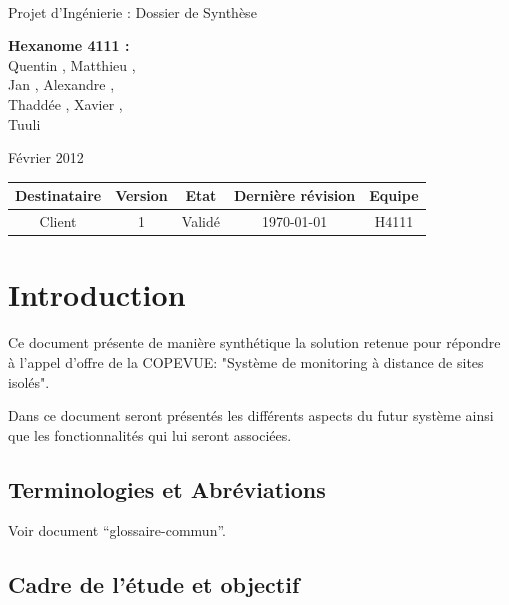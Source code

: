 \documentclass[a4paper]{article}
\begin{document}
\begin{titlepage}
~ 
\vfill
	\begin{center}
		\begin{Huge}
		Projet d'Ingénierie : Dossier de Synthèse\\
		\end{Huge} 
\vfill
		\textbf{Hexanome 4111 :} 
		\\Quentin {}, Matthieu , 
		\\Jan {}, Alexandre , 
		\\Thaddée , Xavier ,
		\\Tuuli {}
\vfill		
		\begin{Large}
		Février 2012
		\end{Large}
\vfill
	\begin{tabular}{|c|c|c|c|c|}
 	 \hline
   Destinataire & Version & Etat & Dernière révision & Equipe \\
   \hline
   Client & 1 & Validé & \today & H4111 \\
   \hline
	\end{tabular}
	\end{center}
\vfill
\end{titlepage}
\newpage
\tableofcontents
\newpage


\section{Introduction}

Ce document présente de manière synthétique la solution retenue pour répondre à l'appel d'offre de la COPEVUE: "Système de monitoring à distance de sites isolés".

Dans ce document seront présentés les différents aspects du futur système ainsi que les fonctionnalités qui lui seront associées.

\subsection{Terminologies et Abréviations}

Voir document ``glossaire-commun''.

\subsection{Cadre de l’étude et objectif}
\end{document}
